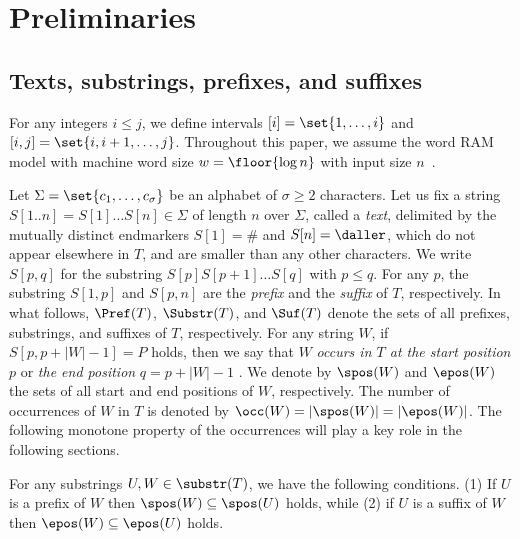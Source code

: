 
\section{Preliminaries}
\label{sec:prelim}

\subsection{Texts, substrings, prefixes, and suffixes}
For any integers $i\le j$, we define intervals $[i]=\set{1,\dots,i}$ and $[i, j] = \set{i, i+1, \dots, j}$. Throughout this paper, we assume the word RAM model with machine word size $w = \floor{\log n}$ with input size $n$~\cite{navarro2016cds:book}.

Let $\Sigma = \set{c_1,\dots,c_\sigma}$ be an alphabet of $\sigma \ge 2$ characters. Let us fix a string $S[1..n] = S[1]\dots S[n] \in \Sigma$ of length $n$ over $\Sigma$, called a \textit{text}, delimited by the mutually distinct endmarkers $S[1]=\#$ and $S[n]=\daller$, which do not appear elsewhere in $T$, and are smaller than any other characters. We write $S[p,q]$ for the substring $S[p]S[p+1]\dots S[q]$ with $p\le q$. For any $p$, the substring $S[1,p]$ and $S[p,n]$ are the \textit{prefix} and the \textit{suffix} of $T$, respectively. In what follows, $\Pref(T)$, $\Substr(T)$, and $\Suf(T)$ denote the sets of all prefixes, substrings, and suffixes of $T$, respectively.
For any string $W$, if $S[p, p+|W|-1] = P$ holds, then we say that $W$ \textit{occurs in $T$ at the start position} $p$ or \textit{the end position} $q = p + |W| - 1$ . We denote by $\spos(W)$ and $\epos(W)$ the sets of all start and end positions of $W$, respectively. The number of occurrences of $W$ in $T$ is denoted by $\occ(W) = |\spos(W)| = |\epos(W)|$. The following monotone property of the occurrences will play a key role in the following sections.  

\begin{lemma}
  \label{lem:occ:monotonicity}
  For any substrings $U, W \in \substr(T)$, we have the following conditions. 
(1) If $U$ is a prefix of $W$ then $\spos(W) \subseteq \spos(U)$ holds, while  
(2) if $U$ is a suffix of $W$ then $\epos(W) \subseteq \epos(U)$ holds. 
\end{lemma}



